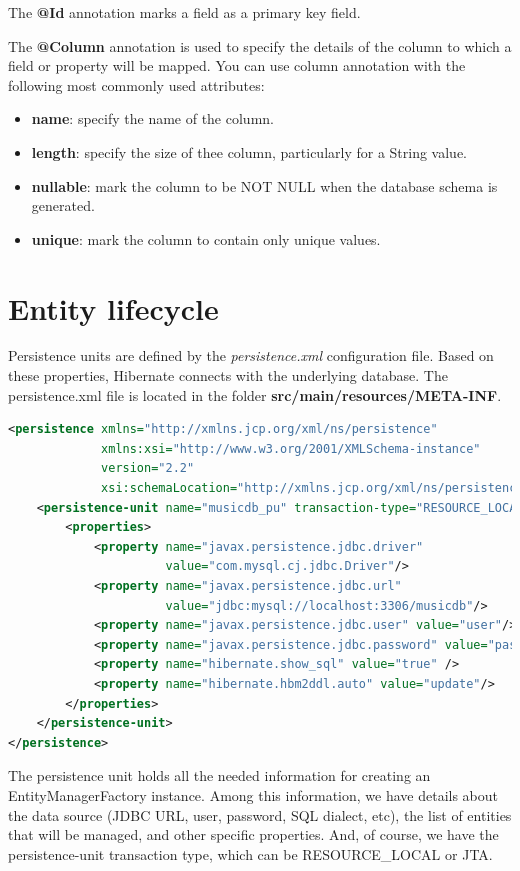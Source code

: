 The \textbf{@Id} annotation marks a field as a primary key field.

The \textbf{@Column} annotation is used to specify the details of the column to which a field or property will be mapped. You can use column annotation with the following most commonly used attributes:
\begin{itemize}
\item \textbf{name}: specify the name of the column.
\item \textbf{length}: specify the size of thee column, particularly for a String value.
\item \textbf{nullable}: mark the column to be NOT NULL when the database schema is generated.
\item \textbf{unique}: mark the column to contain only unique values.
\end{itemize}


\section{Entity lifecycle}


Persistence units are defined by the \textit{persistence.xml} configuration file.  Based on these properties, Hibernate connects with the underlying database.  The persistence.xml file is located in the folder \textbf{src/main/resources/META-INF}.

\begin{lstlisting}[language=xml,frame=single]
<persistence xmlns="http://xmlns.jcp.org/xml/ns/persistence"
             xmlns:xsi="http://www.w3.org/2001/XMLSchema-instance"
             version="2.2"
             xsi:schemaLocation="http://xmlns.jcp.org/xml/ns/persistence http://xmlns.jcp.org/xml/ns/persistence/persistence_2_2.xsd">
	<persistence-unit name="musicdb_pu" transaction-type="RESOURCE_LOCAL">
		<properties>
			<property name="javax.persistence.jdbc.driver"
			          value="com.mysql.cj.jdbc.Driver"/>
			<property name="javax.persistence.jdbc.url"
			          value="jdbc:mysql://localhost:3306/musicdb"/>
			<property name="javax.persistence.jdbc.user" value="user"/>
			<property name="javax.persistence.jdbc.password" value="password"/>
			<property name="hibernate.show_sql" value="true" />
			<property name="hibernate.hbm2ddl.auto" value="update"/>
		</properties>
	</persistence-unit>
</persistence>
\end{lstlisting}

The persistence unit holds all the needed information for creating an EntityManagerFactory instance.  Among this information, we have details about the data source (JDBC URL, user, password, SQL dialect, etc), the list of entities that will be managed, and other specific properties. And, of course, we have the persistence-unit transaction type, which can be RESOURCE\_LOCAL or JTA. 

